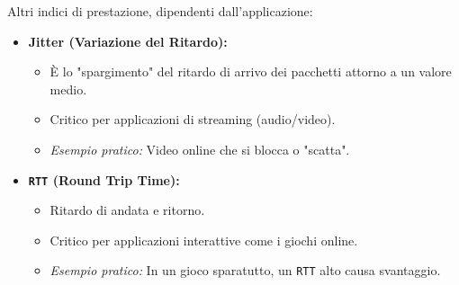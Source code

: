 Altri indici di prestazione, dipendenti dall'applicazione:
\begin{itemize}
    \item \textbf{Jitter (Variazione del Ritardo):}
    \begin{itemize}
        \item È lo "spargimento" del ritardo di arrivo dei pacchetti attorno a un valore medio.
        \item Critico per applicazioni di streaming (audio/video).
        \item \textit{Esempio pratico:} Video online che si blocca o "scatta".
    \end{itemize}
    \item \textbf{\texttt{RTT} (Round Trip Time):}
    \begin{itemize}
        \item Ritardo di andata e ritorno.
        \item Critico per applicazioni interattive come i giochi online.
        \item \textit{Esempio pratico:} In un gioco sparatutto, un \texttt{RTT} alto causa svantaggio.
    \end{itemize}
\end{itemize}

